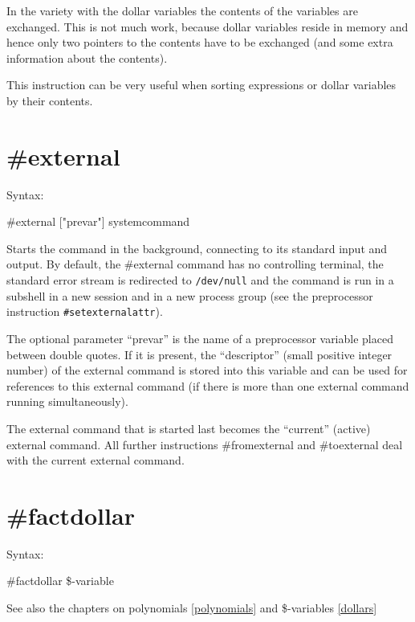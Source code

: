 In the variety with the dollar variables the contents of 
the variables are exchanged. This is not much work, because dollar 
variables reside in memory and hence only two pointers to the contents have 
to be exchanged (and some extra information about the contents).

This instruction can be very useful when sorting expressions or dollar 
variables by their contents.


\section{\#external}
\label{preexternal}

\noindent Syntax:

\#external ["prevar"] systemcommand

\noindent Starts the command in the background, 
connecting to its standard 
input and output. By default, 
the \#external command has no controlling terminal, the standard error stream 
is redirected to \verb|/dev/null| and the command is run in a subshell in a 
new session and in a new process group (see the preprocessor instruction 
\verb|#setexternalattr|).

The optional parameter ``prevar'' is the name of a preprocessor variable 
placed between double quotes. If it is present, the ``descriptor'' (small 
positive integer number) of the external command is stored into this 
variable and can be used for references to this external command (if there 
is more than one external command running simultaneously).

The external command that is started last becomes the ``current'' (active) 
external command.  All further instructions 
\#fromexternal and \#toexternal 
deal with the current external command.


\section{\#factdollar}
\label{prefactdollar}

\noindent Syntax:

\#factdollar \$-variable
 
\noindent See also the chapters on polynomials \ref{polynomials} and 
\$-variables \ref{dollars}

